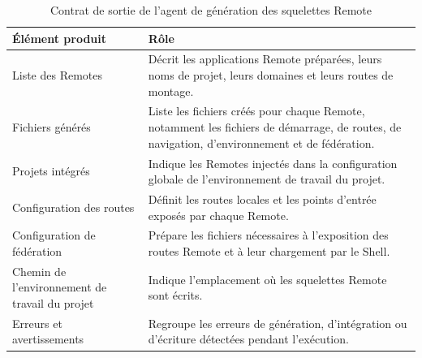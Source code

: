 \begingroup
\renewcommand{\arraystretch}{1.12}
\setlength{\tabcolsep}{4pt}
\begin{longtable}{|p{4cm}|p{9.2cm}|}
\caption{Contrat de sortie de l'agent de génération des squelettes Remote}\label{tab:annexe-sortie-agent-remote-skeletons}\\
\hline
\textbf{Élément produit} & \textbf{Rôle} \\
\hline
Liste des Remotes & Décrit les applications Remote préparées, leurs noms de projet, leurs domaines et leurs routes de montage. \\
\hline
Fichiers générés & Liste les fichiers créés pour chaque Remote, notamment les fichiers de démarrage, de routes, de navigation, d'environnement et de fédération. \\
\hline
Projets intégrés & Indique les Remotes injectés dans la configuration globale de l'environnement de travail du projet. \\
\hline
Configuration des routes & Définit les routes locales et les points d'entrée exposés par chaque Remote. \\
\hline
Configuration de fédération & Prépare les fichiers nécessaires à l'exposition des routes Remote et à leur chargement par le Shell. \\
\hline
Chemin de l'environnement de travail du projet & Indique l'emplacement où les squelettes Remote sont écrits. \\
\hline
Erreurs et avertissements & Regroupe les erreurs de génération, d'intégration ou d'écriture détectées pendant l'exécution. \\
\hline
\end{longtable}
\endgroup

\renewcommand{\thesection}{\thechapter.\arabic{section}}